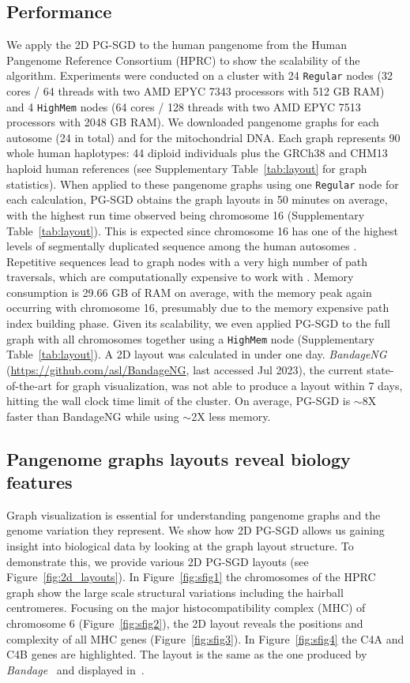 \documentclass{bioinfo}
\theoremstyle{definition}
\begin{document}
    \subsection{Performance}
	We apply the 2D PG-SGD to the human pangenome \citep{Liao2023} from the Human Pangenome Reference Consortium (HPRC) to show the scalability of the algorithm.
	Experiments were conducted on a cluster with 24 \texttt{Regular} nodes (32 cores / 64 threads with two AMD EPYC 7343 processors with 512 GB RAM) and 4 \texttt{HighMem} nodes (64 cores / 128 threads with two AMD EPYC 7513 processors with 2048 GB RAM).
	We downloaded pangenome graphs for each autosome (24 in total) and for the mitochondrial DNA.
	Each graph represents 90 whole human haplotypes: 44 diploid individuals plus the GRCh38 \citep{Schneider2017} and CHM13 \citep{Nurk_2021} haploid human references (see Supplementary Table~\ref{tab:layout} for graph statistics).
	When applied to these pangenome graphs using one \texttt{Regular} node for each calculation, PG-SGD obtains the graph layouts in 50 minutes on average, with the highest run time observed being chromosome 16 (Supplementary Table~\ref{tab:layout}).
	This is expected since chromosome 16 has one of the highest levels of segmentally duplicated sequence among the human autosomes \citep{Martin2004}.
	Repetitive sequences lead to graph nodes with a very high number of path traversals, which are computationally expensive to work with \citep{Guarracino2022}.
	Memory consumption is 29.66 GB of RAM on average, with the memory peak again occurring with chromosome 16, presumably due to the memory expensive path index building phase.
	Given its scalability, we even applied PG-SGD to the full graph with all chromosomes together using a \texttt{HighMem} node (Supplementary Table~\ref{tab:layout}). 
	A 2D layout was calculated in under one day.
	\textit{BandageNG} (\url{https://github.com/asl/BandageNG}, last accessed Jul 2023), the current state-of-the-art for graph visualization, was not able to produce a layout within 7 days, hitting the wall clock time limit of the cluster.
	On average, PG-SGD is $\sim$8X faster than BandageNG while using $\sim$2X less memory.

    \subsection{Pangenome graphs layouts reveal biology features}
	Graph visualization is essential for understanding pangenome graphs and the genome variation they represent. 
	We show how 2D PG-SGD allows us gaining insight into biological data by looking at the graph layout structure. 
	To demonstrate this, we provide various 2D PG-SGD layouts (see Figure~\ref{fig:2d_layouts}).
	In Figure~\ref{fig:sfig1} the chromosomes of the HPRC graph show the large scale structural variations including the hairball centromeres. 
	Focusing on the major histocompatibility complex (MHC) of chromosome 6 (Figure~\ref{fig:sfig2}), the 2D layout reveals the positions and complexity of all MHC genes (Figure~\ref{fig:sfig3}). 
	In Figure~\ref{fig:sfig4} the C4A and C4B genes are highlighted. 
	The layout is the same as the one produced by \textit{Bandage}~\citep{Wick_2015} and displayed in~\citep{Guarracino2022}.
\end{document}
